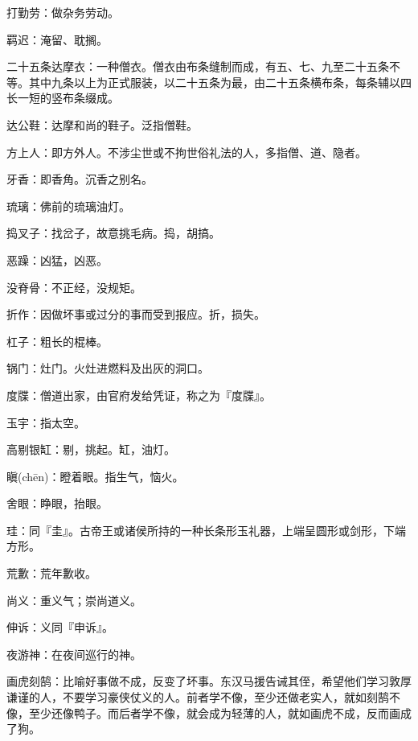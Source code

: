 \startbuffer[1287]
打勤劳：做杂务劳动。
\stopbuffer


\startbuffer[1288]
羁迟：淹留、耽搁。
\stopbuffer


\startbuffer[1289]
二十五条达摩衣：一种僧衣。僧衣由布条缝制而成，有五、七、九至二十五条不等。其中九条以上为正式服装，以二十五条为最，由二十五条横布条，每条辅以四长一短的竖布条缀成。
\stopbuffer


\startbuffer[1290]
达公鞋：达摩和尚的鞋子。泛指僧鞋。
\stopbuffer


\startbuffer[1291]
方上人：即方外人。不涉尘世或不拘世俗礼法的人，多指僧、道、隐者。
\stopbuffer


\startbuffer[1292]
牙香：即香角。沉香之别名。
\stopbuffer


\startbuffer[1293]
琉璃：佛前的琉璃油灯。
\stopbuffer


\startbuffer[1294]
捣叉子：找岔子，故意挑毛病。捣，胡搞。
\stopbuffer


\startbuffer[1295]
恶躁：凶猛，凶恶。
\stopbuffer


\startbuffer[1296]
没脊骨：不正经，没规矩。
\stopbuffer


\startbuffer[1297]
折作：因做坏事或过分的事而受到报应。折，损失。
\stopbuffer


\startbuffer[1298]
杠子：粗长的棍棒。
\stopbuffer


\startbuffer[1299]
锅门：灶门。火灶进燃料及出灰的洞口。
\stopbuffer


\startbuffer[1300]
度牒：僧道出家，由官府发给凭证，称之为『度牒』。
\stopbuffer


\startbuffer[1301]
玉宇：指太空。
\stopbuffer


\startbuffer[1302]
高剔银缸：剔，挑起。缸，油灯。
\stopbuffer


\startbuffer[1303]
瞋(chēn)：瞪着眼。指生气，恼火。
\stopbuffer


\startbuffer[1304]
舍眼：睁眼，抬眼。
\stopbuffer


\startbuffer[1305]
珪：同『圭』。古帝王或诸侯所持的一种长条形玉礼器，上端呈圆形或剑形，下端方形。
\stopbuffer


\startbuffer[1306]
荒歉：荒年歉收。
\stopbuffer


\startbuffer[1307]
尚义：重义气；崇尚道义。
\stopbuffer


\startbuffer[1308]
伸诉：义同『申诉』。
\stopbuffer


\startbuffer[1309]
夜游神：在夜间巡行的神。
\stopbuffer


\startbuffer[1310]
画虎刻鹄：比喻好事做不成，反变了坏事。东汉马援告诫其侄，希望他们学习敦厚谦谨的人，不要学习豪侠仗义的人。前者学不像，至少还做老实人，就如刻鹄不像，至少还像鸭子。而后者学不像，就会成为轻薄的人，就如画虎不成，反而画成了狗。
\stopbuffer


